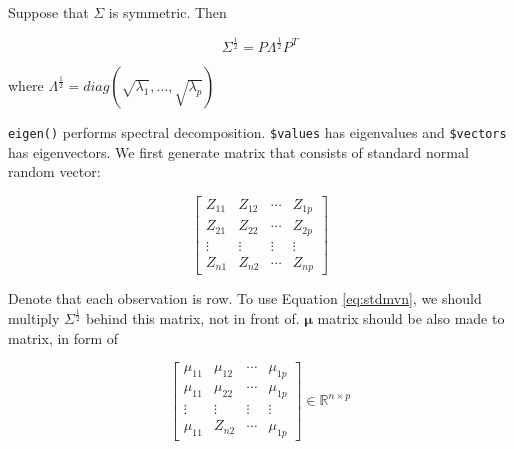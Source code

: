 \documentclass[]{book}
\theoremstyle{definition}
\theoremstyle{definition}
\theoremstyle{definition}
\theoremstyle{remark}
\let\BeginKnitrBlock\begin \let\EndKnitrBlock\end
\begin{document}
\BeginKnitrBlock{corollary}
\protect\hypertarget{cor:specsqrt}{}{\label{cor:specsqrt} }Suppose that \(\Sigma\) is symmetric. Then

\[\Sigma^{\frac{1}{2}} = P \Lambda^{\frac{1}{2}} P^T\]

where \(\Lambda^{\frac{1}{2}} = diag(\sqrt{\lambda_1}, \ldots, \sqrt{\lambda_p})\)
\EndKnitrBlock{corollary}

\texttt{eigen()} performs spectral decomposition. \texttt{\$values} has eigenvalues and \texttt{\$vectors} has eigenvectors. We first generate matrix that consists of standard normal random vector:

\[
\begin{bmatrix}
  Z_{11} & Z_{12} & \cdots & Z_{1p} \\
  Z_{21} & Z_{22} & \cdots & Z_{2p} \\
  \vdots & \vdots & \vdots & \vdots \\
  Z_{n1} & Z_{n2} & \cdots & Z_{np}
\end{bmatrix}
\]

Denote that each observation is row. To use Equation \eqref{eq:stdmvn}, we should multiply \(\Sigma^{\frac{1}{2}}\) behind this matrix, not in front of. \(\boldsymbol\mu\) matrix should be also made to matrix, in form of

\[
\begin{bmatrix}
  \mu_{11} & \mu_{12} & \cdots & \mu_{1p} \\
  \mu_{11} & \mu_{22} & \cdots & \mu_{1p} \\
  \vdots & \vdots & \vdots & \vdots \\
  \mu_{11} & Z_{n2} & \cdots & \mu_{1p}
\end{bmatrix} \in \mathbb{R}^{n \times p}
\]
\end{document}
